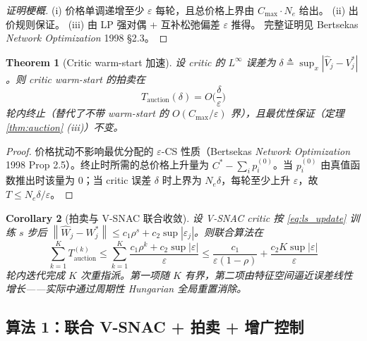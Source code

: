 \documentclass[11pt,a4paper]{article}
\newcommand{\norm}[1]{\left\lVert #1 \right\rVert}
\newtheorem{theorem}{Theorem}
\newtheorem{corollary}[theorem]{Corollary}
\theoremstyle{remark}
\begin{document}
\begin{proof}[证明梗概]
(i) 价格单调递增至少 $\varepsilon$ 每轮，且总价格上界由 $C_{\max}\cdot N_e$ 给出。
(ii) 出价规则保证。
(iii) 由 LP 强对偶 + 互补松弛偏差 $\varepsilon$ 推得。
完整证明见 Bertsekas \emph{Network Optimization} 1998 §2.3。
\end{proof}

\begin{theorem}[Critic warm-start 加速]\label{thm:critic_speedup}
设 critic 的 $L^\infty$ 误差为 $\delta\triangleq\sup_x|\hat V_j-V_j^*|$。则 critic warm-start 的拍卖在
\begin{equation}
T_{\text{auction}}(\delta)= O\!\Big(\frac{\delta}{\varepsilon}\Big)
\label{eq:auction_speedup}
\end{equation}
轮内终止（替代了不带 warm-start 的 $O(C_{\max}/\varepsilon)$ 界），且最优性保证（定理 \ref{thm:auction} (iii)）不变。
\end{theorem}

\begin{proof}
价格扰动不影响最优分配的 $\varepsilon$-CS 性质（Bertsekas \emph{Network Optimization} 1998 Prop 2.5）。终止时所需的总价格上升量为 $C^*-\sum_i p_i^{(0)}$。当 $p_i^{(0)}$ 由真值函数推出时该量为 0；当 critic 误差 $\delta$ 时上界为 $N_e\delta$，每轮至少上升 $\varepsilon$，故 $T\le N_e\delta/\varepsilon$。
\end{proof}

\begin{corollary}[拍卖与 V-SNAC 联合收敛]\label{cor:joint_convergence}
设 V-SNAC critic 按 \eqref{eq:ls_update} 训练 $s$ 步后 $\norm{\hat W_j-W_j^*}\le c_1\rho^s+c_2\sup|\varepsilon_j|$。则联合算法在
\begin{equation}
\sum_{k=1}^K T_{\text{auction}}^{(k)}\le \sum_{k=1}^K \frac{c_1\rho^k+c_2\sup|\varepsilon|}{\varepsilon}
\le \frac{c_1}{\varepsilon(1-\rho)}+\frac{c_2 K \sup|\varepsilon|}{\varepsilon}
\end{equation}
轮内迭代完成 $K$ 次重指派。第一项随 $K$ 有界，第二项由特征空间逼近误差线性增长——实际中通过周期性 Hungarian 全局重置消除。
\end{corollary}

\subsection{算法 1：联合 V-SNAC + 拍卖 + 增广控制}
\end{document}
